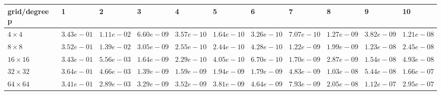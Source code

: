 \begin{tabular}{lllllllllll}
\hline
 grid/degree p   & 1          & 2          & 3          & 4          & 5          & 6          & 7          & 8          & 9          & 10         \\
\hline
 $4 \times 4$    & $3.43e-01$ & $1.11e-02$ & $6.60e-09$ & $3.57e-10$ & $1.64e-10$ & $3.26e-10$ & $7.07e-10$ & $1.27e-09$ & $3.82e-09$ & $1.21e-08$ \\
 $8 \times 8$    & $3.52e-01$ & $1.39e-02$ & $3.05e-09$ & $2.55e-10$ & $2.44e-10$ & $4.28e-10$ & $1.22e-09$ & $1.99e-09$ & $1.23e-08$ & $2.45e-08$ \\
 $16 \times 16$  & $3.43e-01$ & $5.56e-03$ & $1.64e-09$ & $2.29e-10$ & $4.05e-10$ & $6.70e-10$ & $1.70e-09$ & $2.87e-09$ & $1.54e-08$ & $4.93e-08$ \\
 $32 \times 32$  & $3.64e-01$ & $4.66e-03$ & $1.39e-09$ & $1.59e-09$ & $1.94e-09$ & $1.79e-09$ & $4.83e-09$ & $1.03e-08$ & $5.44e-08$ & $1.66e-07$ \\
 $64 \times 64$  & $3.41e-01$ & $2.89e-03$ & $3.29e-09$ & $3.52e-09$ & $3.81e-09$ & $4.64e-09$ & $7.93e-09$ & $2.05e-08$ & $1.12e-07$ & $2.95e-07$ \\
\hline
\end{tabular}